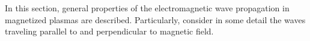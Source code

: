 In this section, general properties of the electromagnetic wave propagation in magnetized plasmas are described. Particularly, consider in some detail the waves traveling parallel to and perpendicular to magnetic field.